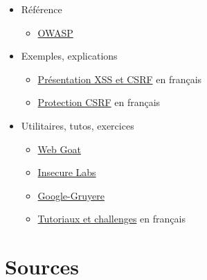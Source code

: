 \begin{itemize}
\tightlist
\item
  Référence

  \begin{itemize}
  \tightlist
  \item
    \href{https://www.owasp.org/index.php/Main_Page}{OWASP}
  \end{itemize}
\item
  Exemples, explications

  \begin{itemize}
  \tightlist
  \item
    \href{http://www.journaldunet.com/developpeur/tutoriel/php/031030php_nexen-xss1.shtml}{Présentation
    XSS et CSRF} en français
  \item
    \href{http://www.apprendre-php.com/tutoriels/tutoriel-39-introduction-aux-cross-site-request-forgeries-ou-sea-surf.html}{Protection
    CSRF} en français
  \end{itemize}
\item
  Utilitaires, tutos, exercices

  \begin{itemize}
  \tightlist
  \item
    \href{https://www.owasp.org/index.php/Webgoat}{Web Goat}
  \item
    \href{http://www.insecurelabs.org/task}{Insecure Labs}
  \item
    \href{http://google-gruyere.appspot.com/}{Google-Gruyere}
  \item
    \href{https://www.securite-info.org/}{Tutoriaux et challenges} en
    français
  \end{itemize}
\end{itemize}

\begin{otherlanguage}{english}

\end{otherlanguage}

\begin{otherlanguage}{english}

\end{otherlanguage}

\begin{otherlanguage}{english}

\end{otherlanguage}

\hypertarget{sources}{%
\section{Sources}\label{sources}}
